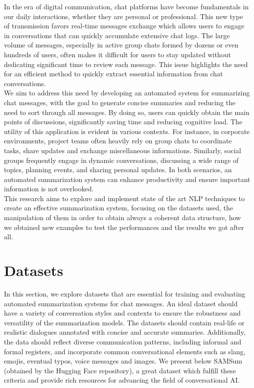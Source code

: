 \documentclass[10pt,twocolumn,letterpaper]{article}
\begin{document}
In the era of digital communication, chat platforms have become fundamentals in our daily interactions, whether they are personal or professional. This new type of transmission favors real-time messages exchange which allows users to engage in conversations that can quickly accumulate extensive chat logs. The large volume of messages, especially in active group chats formed by dozens or even hundreds of users, often makes it difficult for users to stay updated without dedicating significant time to review each message. This issue highlights the need for an efficient method to quickly extract essential information from chat conversations. \\
We aim to address this need by developing an automated system for summarizing chat messages, with the goal to generate concise summaries and reducing the need to sort through all messages. By doing so, users can quickly obtain the main points of discussions, significantly saving time and reducing cognitive load. The utility of this application is evident in various contexts. For instance, in corporate environments, project teams often heavily rely on group chats to coordinate tasks, share updates and exchange miscellaneous informations. Similarly, social groups frequently engage in dynamic conversations, discussing a wide range of topics, planning events, and sharing personal updates. In both scenarios, an automated summarization system can enhance productivity and ensure important information is not overlooked. \\
This research aims to explore and implement state of the art NLP techniques to create an effective summarization system, focusing on the datasets used, the manipulation of them in order to obtain always a coherent data structure, how we obtained new examples to test the performances and the results we got after all.

\section{Datasets}

In this section, we explore datasets that are essential for training and evaluating automated summarization systems for chat messages. An ideal dataset should have a variety of conversation styles and contexts to ensure the robustness and versatility of the summarization models. The datasets should contain real-life or realistic dialogues annotated with concise and accurate summaries. Additionally, the data should reflect diverse communication patterns, including informal and formal registers, and incorporate common conversational elements such as slang, emojis, eventual typos, voice messages and images. We present below SAMSum (obtained by the Hugging Face repository), a great dataset which fulfill these criteria and provide rich resources for advancing the field of conversational AI.
\end{document}
